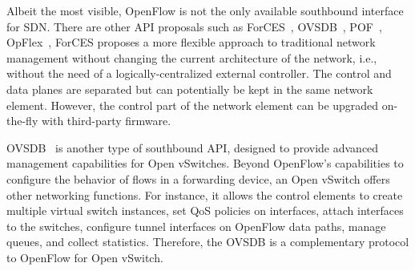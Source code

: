 Albeit the most visible, OpenFlow is not the only available southbound interface for SDN.
There are other API proposals such as ForCES~\cite{doria2010}, OVSDB~\cite{pfaff2013-1}, POF~\cite{song2013,song2013-1}, OpFlex~\cite{smith2014}, 
ForCES proposes a more flexible approach to traditional network management without changing the current architecture of the network, i.e., without the need of a logically-centralized external controller. 
The control and data planes are separated but can potentially be kept in the same network element.
However, the control part of the network element can be upgraded on-the-fly with third-party firmware.


OVSDB~\cite{pfaff2013-1} is another type of southbound API, designed to provide 
advanced management capabilities for Open vSwitches. Beyond OpenFlow's capabilities to configure 
the behavior of flows in a forwarding device, an Open vSwitch offers other networking functions.
For instance, it allows the control elements to create multiple virtual switch instances, set QoS 
policies on interfaces, attach interfaces to the switches, configure tunnel interfaces on OpenFlow 
data paths, manage queues, and collect statistics.
Therefore, the OVSDB is a complementary protocol to OpenFlow for Open vSwitch. 


%

